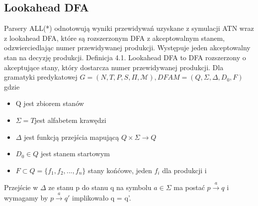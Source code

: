 ﻿\subsection{Lookahead DFA}
Parsery ALL(*) odnotowują wyniki przewidywań uzyskane z symulacji ATN wraz z lookahead DFA,
które są rozszerzonym DFA z akceptowalnym stanem, odzwierciedlając numer przewidywanej produkcji.
Występuje jeden akceptowalny stan na decyzję produkcji. 
Definicja 4.1. Lookahead DFA to DFA rozszerzony o akceptujące stany,
który dostarcza numer przewidywanej produkcji.
Dla gramatyki predykatowej \(G = (N, T, P, S, \Pi, \mathcal{M}), DFA M = (Q, \Sigma, \Delta, D_0, F) \) gdzie
\begin{itemize}
\item Q jest zbiorem stanów
\item \(\Sigma = T \)jest alfabetem krawędzi
\item \( \Delta \) jest funkcją przejścia mapującą \( Q \times \Sigma \rightarrow Q \)
\item \( D_0 \in Q \) jest stanem startowym
\item \( F \subset Q  = \{  f_1, f_2, ..., f_n\}\) stany końćowe, jeden \( f_i \)  dla produkcji i
\end{itemize}
Przejście w \( \Delta \) ze stanu p do stanu q na symbolu \( a \in \Sigma \)
ma postać \( p \overset{a}{\rightarrow} q \) i wymagamy by \(p \overset{a}{\rightarrow} q' \)
implikowało  q = q'.

